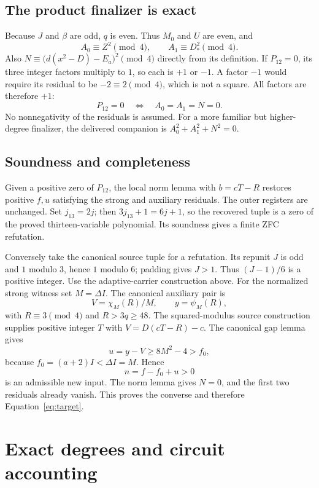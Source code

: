 \documentclass[11pt]{article}
\theoremstyle{remark}
\begin{document}
\subsection{The product finalizer is exact}

Because $J$ and $\beta$ are odd, $q$ is even. Thus $M_0$ and $U$ are
even, and
\[
 A_0\equiv Z^2\pmod4,\qquad A_1\equiv D_*^2\pmod4.
\]
Also $N\equiv\bigl(d(x^2-D)-E_a\bigr)^2\pmod4$ directly from its
definition. If $P_{12}=0$, its three integer factors multiply to $1$,
so each is $+1$ or $-1$. A factor $-1$ would require its residual to be
$-2\equiv2\pmod4$, which is not a square. All factors are therefore
$+1$:
\begin{equation}
 P_{12}=0\quad\Longleftrightarrow\quad A_0=A_1=N=0.
 \label{eq:productexact}
\end{equation}
No nonnegativity of the residuals is assumed. For a more familiar but
higher-degree finalizer, the delivered companion is
$A_0^2+A_1^2+N^2=0$.

\subsection{Soundness and completeness}

Given a positive zero of $P_{12}$, the local norm lemma with $b=cT-R$
restores positive $f,u$ satisfying the strong and auxiliary residuals.
The outer registers are unchanged. Set $j_{13}=2j$; then
$3j_{13}+1=6j+1$, so the recovered tuple is a zero of the proved
thirteen-variable polynomial. Its soundness gives a finite ZFC refutation.

Conversely take the canonical source tuple for a refutation. Its repunit
$J$ is odd and $1$ modulo $3$, hence $1$ modulo $6$; padding gives $J>1$.
Thus $(J-1)/6$ is a positive integer. Use the adaptive-carrier construction
above. For the normalized strong witness set $M=\Delta I$. The canonical
auxiliary pair is
\[
 V=\chi_M(R)/M,\qquad y=\psi_M(R),
\]
with $R\equiv3\pmod4$ and $R>3q\ge48$. The squared-modulus source
construction supplies positive integer $T$ with $V=D(cT-R)-c$.
The canonical gap lemma gives
\[
 u=y-V\ge8M^2-4>f_0,
\]
because $f_0=(a+2)I<\Delta I=M$. Hence
\[
 n=f-f_0+u>0
\]
is an admissible new input. The norm lemma gives $N=0$, and the first two
residuals already vanish. This proves the converse and therefore
Equation~\eqref{eq:target}.

\section{Exact degrees and circuit accounting}
\label{sec:degree}
\end{document}
